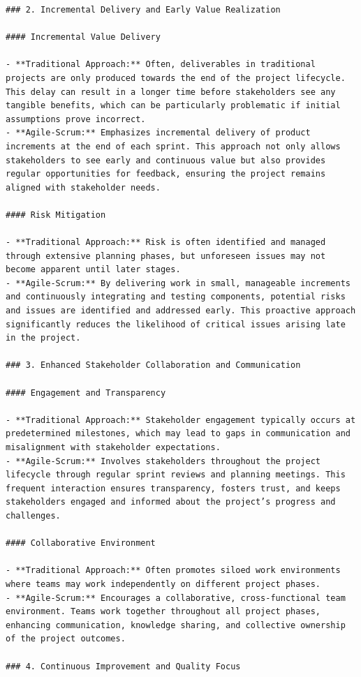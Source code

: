 \documentclass[
  letterpaper,
  DIV=11,
  numbers=noendperiod]{scrreprt}
\begin{document}
\begin{verbatim}
### 2. Incremental Delivery and Early Value Realization

#### Incremental Value Delivery

- **Traditional Approach:** Often, deliverables in traditional projects are only produced towards the end of the project lifecycle. This delay can result in a longer time before stakeholders see any tangible benefits, which can be particularly problematic if initial assumptions prove incorrect.
- **Agile-Scrum:** Emphasizes incremental delivery of product increments at the end of each sprint. This approach not only allows stakeholders to see early and continuous value but also provides regular opportunities for feedback, ensuring the project remains aligned with stakeholder needs.

#### Risk Mitigation

- **Traditional Approach:** Risk is often identified and managed through extensive planning phases, but unforeseen issues may not become apparent until later stages.
- **Agile-Scrum:** By delivering work in small, manageable increments and continuously integrating and testing components, potential risks and issues are identified and addressed early. This proactive approach significantly reduces the likelihood of critical issues arising late in the project.

### 3. Enhanced Stakeholder Collaboration and Communication

#### Engagement and Transparency

- **Traditional Approach:** Stakeholder engagement typically occurs at predetermined milestones, which may lead to gaps in communication and misalignment with stakeholder expectations.
- **Agile-Scrum:** Involves stakeholders throughout the project lifecycle through regular sprint reviews and planning meetings. This frequent interaction ensures transparency, fosters trust, and keeps stakeholders engaged and informed about the project’s progress and challenges.

#### Collaborative Environment

- **Traditional Approach:** Often promotes siloed work environments where teams may work independently on different project phases.
- **Agile-Scrum:** Encourages a collaborative, cross-functional team environment. Teams work together throughout all project phases, enhancing communication, knowledge sharing, and collective ownership of the project outcomes.

### 4. Continuous Improvement and Quality Focus


\end{verbatim}
\end{document}
